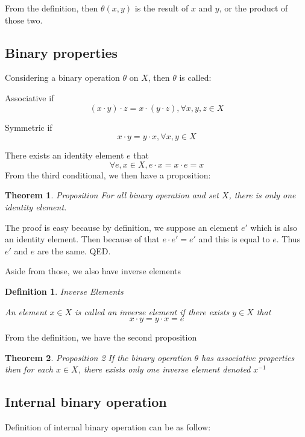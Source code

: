 \documentclass{book}
\newtheorem{Definition}{Definition}[section]
\newtheorem{Theorem}{Theorem}[section]
\numberwithin{identity}{subsection}
\numberwithin{Rule}{subsection}
\numberwithin{Theorem}{subsection}
\numberwithin{Definition}{subsection}
\begin{document}
From the definition, then $\theta(x,y)$ is the result of $x$ and $y$, or the product of those two. 
\subsection{Binary properties}

Considering a binary operation $\theta$ on $X$, then $\theta$ is called: 

\vspace{5mm}

Associative if $$(x\cdot y)\cdot z=x\cdot(y\cdot z), \forall x,y,z\in X$$

\vspace{5mm}

Symmetric if $$x\cdot y = y \cdot x, \forall x,y \in X$$

\vspace{5mm}

There exists an identity element $e$ that $$\forall e,x \in X, e\cdot x=x \cdot e = x$$
From the third conditional, we then have a proposition: 

\begin{Theorem}Proposition 
For all binary operation and set $X$, there is only one identity element. 
\end{Theorem}

The proof is easy because by definition, we suppose an element $e'$ which is also an identity element. Then because of that $e\cdot e' = e'$ and this is equal to $e$. Thus $e'$ and $e$ are the same. QED. 

Aside from those, we also have inverse elements
\begin{Definition}
    Inverse Elements

An element $x \in X$ is called an inverse element if there exists $y \in X$ that $$x\cdot y = y \cdot x = e$$
    
\end{Definition}

From the definition, we have the second proposition

\begin{Theorem}
    Proposition 2
If the binary operation $\theta$ has associative properties then for each $x \in X$, there exists only one inverse element denoted $x^{-1}$
\end{Theorem}

\subsection{Internal binary operation}
Definition of internal binary operation can be as follow: 
\end{document}
